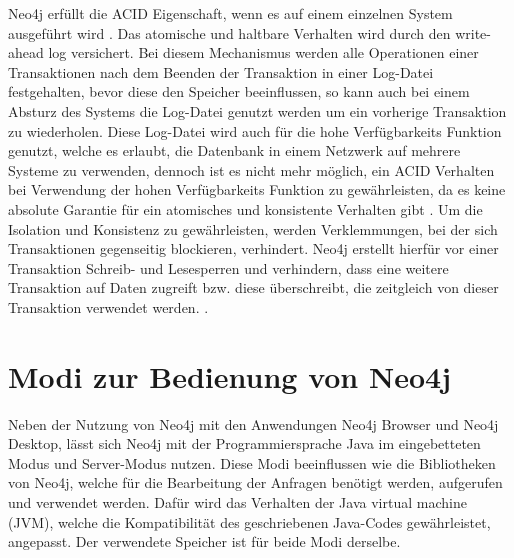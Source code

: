   Neo4j erfüllt die ACID Eigenschaft, wenn es auf einem einzelnen System ausgeführt wird \parencite{holzschuher2013performance}. Das atomische und haltbare Verhalten wird durch den write-ahead log versichert. Bei diesem Mechanismus  werden alle Operationen einer Transaktionen nach dem Beenden der Transaktion in einer Log-Datei  festgehalten, bevor diese  den Speicher beeinflussen, so kann auch bei einem Absturz des Systems die Log-Datei genutzt werden um ein vorherige Transaktion zu wiederholen. Diese Log-Datei wird auch für die  hohe Verfügbarkeits Funktion genutzt, welche es erlaubt, die Datenbank in einem Netzwerk auf mehrere Systeme zu verwenden, dennoch ist es nicht mehr möglich, ein  ACID Verhalten bei Verwendung der hohen Verfügbarkeits Funktion zu gewährleisten, da es keine absolute Garantie für ein  atomisches und konsistente Verhalten gibt \parencite{vukotic2015neo4j}. Um die Isolation und Konsistenz zu gewährleisten, werden Verklemmungen, bei der sich Transaktionen gegenseitig blockieren, verhindert. Neo4j erstellt hierfür vor einer Transaktion Schreib- und Lesesperren und verhindern, dass eine weitere Transaktion auf Daten zugreift bzw. diese überschreibt, die zeitgleich von dieser Transaktion verwendet werden. \parencite{raj2015neo4j}.
\section {Modi zur Bedienung von Neo4j}
Neben der Nutzung von Neo4j mit den Anwendungen Neo4j  Browser und Neo4j Desktop, lässt sich Neo4j mit der Programmiersprache Java im eingebetteten Modus und Server-Modus nutzen. Diese Modi beeinflussen wie die Bibliotheken von Neo4j, welche für die Bearbeitung der Anfragen benötigt werden, aufgerufen und verwendet werden. Dafür wird das Verhalten der Java virtual machine (JVM), welche die Kompatibilität des geschriebenen Java-Codes gewährleistet, angepasst. Der verwendete Speicher ist für beide Modi derselbe.

